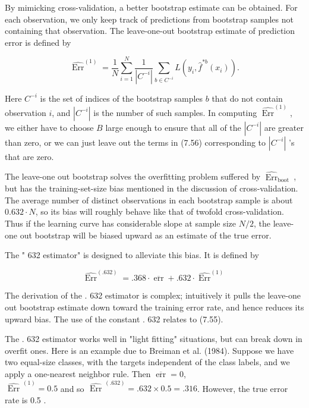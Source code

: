 \documentclass[10pt]{article}
\begin{document}
By mimicking cross-validation, a better bootstrap estimate can be obtained. For each observation, we only keep track of predictions from bootstrap samples not containing that observation. The leave-one-out bootstrap estimate of prediction error is defined by


\begin{equation*}
\widehat{\operatorname{Err}}^{(1)}=\frac{1}{N} \sum_{i=1}^{N} \frac{1}{\left|C^{-i}\right|} \sum_{b \in C^{-i}} L\left(y_{i}, \hat{f}^{* b}\left(x_{i}\right)\right) . \tag{7.56}
\end{equation*}


Here $C^{-i}$ is the set of indices of the bootstrap samples $b$ that do not contain observation $i$, and $\left|C^{-i}\right|$ is the number of such samples. In computing $\widehat{\operatorname{Err}}^{(1)}$, we either have to choose $B$ large enough to ensure that all of the $\left|C^{-i}\right|$ are greater than zero, or we can just leave out the terms in (7.56) corresponding to $\left|C^{-i}\right|$ 's that are zero.

The leave-one out bootstrap solves the overfitting problem suffered by $\widehat{\operatorname{Err}}_{\text {boot }}$, but has the training-set-size bias mentioned in the discussion of cross-validation. The average number of distinct observations in each bootstrap sample is about $0.632 \cdot N$, so its bias will roughly behave like that of twofold cross-validation. Thus if the learning curve has considerable slope at sample size $N / 2$, the leave-one out bootstrap will be biased upward as an estimate of the true error.

The " 632 estimator" is designed to alleviate this bias. It is defined by


\begin{equation*}
\widehat{\operatorname{Err}}^{(.632)}=.368 \cdot \overline{\operatorname{err}}+.632 \cdot \widehat{\operatorname{Err}}^{(1)} \tag{7.57}
\end{equation*}


The derivation of the . 632 estimator is complex; intuitively it pulls the leave-one out bootstrap estimate down toward the training error rate, and hence reduces its upward bias. The use of the constant . 632 relates to (7.55).

The . 632 estimator works well in "light fitting" situations, but can break down in overfit ones. Here is an example due to Breiman et al. (1984). Suppose we have two equal-size classes, with the targets independent of the class labels, and we apply a one-nearest neighbor rule. Then $\overline{\operatorname{err}}=0$,\\
$\widehat{\text { Err }}^{(1)}=0.5$ and so $\widehat{\text { Err }}^{(.632)}=.632 \times 0.5=.316$. However, the true error rate is 0.5 .
\end{document}
